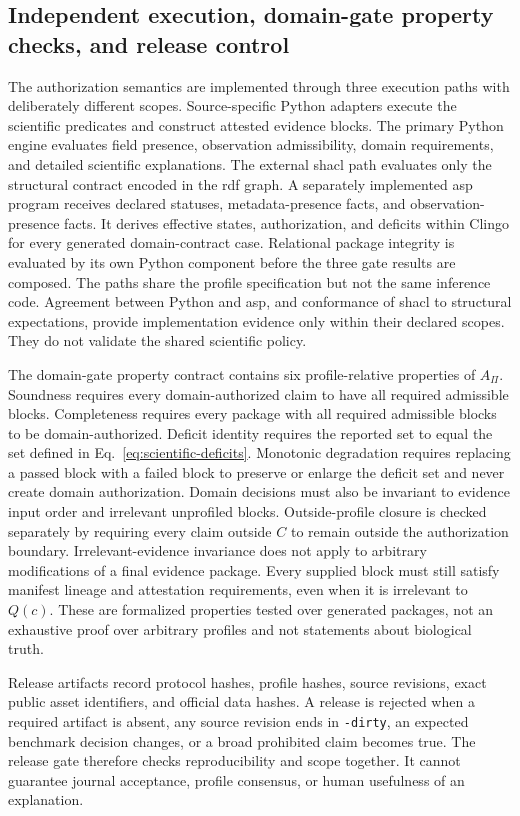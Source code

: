 \subsection{Independent execution, domain-gate property checks, and release control}
\label{subsec:execution-release}

The authorization semantics are implemented through three execution paths with deliberately different scopes. Source-specific Python adapters execute the scientific predicates and construct attested evidence blocks. The primary Python engine evaluates field presence, observation admissibility, domain requirements, and detailed scientific explanations. The external \ac{shacl} path evaluates only the structural contract encoded in the \ac{rdf} graph. A separately implemented \ac{asp} program receives declared statuses, metadata-presence facts, and observation-presence facts. It derives effective states, authorization, and deficits within Clingo for every generated domain-contract case. Relational package integrity is evaluated by its own Python component before the three gate results are composed. The paths share the profile specification but not the same inference code. Agreement between Python and \ac{asp}, and conformance of \ac{shacl} to structural expectations, provide implementation evidence only within their declared scopes. They do not validate the shared scientific policy.

The domain-gate property contract contains six profile-relative properties of $A_{\Pi}$. Soundness requires every domain-authorized claim to have all required admissible blocks. Completeness requires every package with all required admissible blocks to be domain-authorized. Deficit identity requires the reported set to equal the set defined in Eq.~\ref{eq:scientific-deficits}. Monotonic degradation requires replacing a passed block with a failed block to preserve or enlarge the deficit set and never create domain authorization. Domain decisions must also be invariant to evidence input order and irrelevant unprofiled blocks. Outside-profile closure is checked separately by requiring every claim outside $C$ to remain outside the authorization boundary. Irrelevant-evidence invariance does not apply to arbitrary modifications of a final evidence package. Every supplied block must still satisfy manifest lineage and attestation requirements, even when it is irrelevant to $Q(c)$. These are formalized properties tested over generated packages, not an exhaustive proof over arbitrary profiles and not statements about biological truth.

Release artifacts record protocol hashes, profile hashes, source revisions, exact public asset identifiers, and official data hashes. A release is rejected when a required artifact is absent, any source revision ends in \texttt{-dirty}, an expected benchmark decision changes, or a broad prohibited claim becomes true. The release gate therefore checks reproducibility and scope together. It cannot guarantee journal acceptance, profile consensus, or human usefulness of an explanation.
